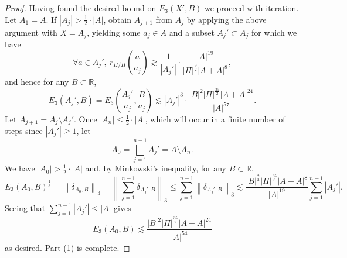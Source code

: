\documentclass[reqno]{amsart}
\numberwithin{equation}{section}
\begin{document}
\begin{proof}
Having found the desired bound on \(E_3(X',B)\) we proceed with iteration.
Let \(A_1 = A\). 
If \(\left\lvert A_{j} \right\rvert  > \frac{1}{2} \cdot \left\lvert A \right\rvert  \), obtain \(A_{j+1} \) from \(A_{j} \) by applying the above argument
with \(X = A_{j} \), yielding some \(a_{j}  \in A\) and a subset \(A_{j} ' \subset A_{j} \) for which we have
\[
    \forall a \in A_{j} ' ,~ r_{ \Pi / \Pi } \left( \frac{a}{a_{j} }   \right)  \gtrsim \frac{1}{\left\lvert A_{j} ' \right\rvert } \cdot \frac{\left\lvert A \right\rvert ^{19}}{\left\lvert \Pi \right\rvert ^{\frac{9}{2} } \left\lvert A + A \right\rvert ^{8}} 
,\]
and hence for any \(B \subset \mathbb{R} \),
\[
    E_3(A_{j} ',B) = E_3 \left( \frac{A_{j} '}{a_{j} } , \frac{B}{a_{j} }    \right) \lesssim \left\lvert A_{j} ' \right\rvert ^{3} \cdot \frac{\left\lvert B \right\rvert ^{2} \left\lvert \Pi \right\rvert ^{\frac{35}{2} }\left\lvert A+A \right\rvert ^{24}}{\left\lvert A \right\rvert ^{57}} 
.\]
Let \(A_{j+1} = A_{j} \setminus A_{j} ' \). Once \(\left\lvert A_{n}  \right\rvert \leq \frac{1}{2} \cdot \left\lvert A \right\rvert     \), which will occur in a finite number of steps since \(\left\lvert A_{j} '  \right\rvert \geq 1\),
let
\[
    A_0 = \bigsqcup  _{j=1} ^{n-1}A_{j} ' = A \setminus A_{n} 
.\]
We have \(\left\lvert A_0 \right\rvert > \frac{1}{2} \cdot \left\lvert A \right\rvert \) and, by Minkowski's inequality, for any \(B \subset \mathbb{R} \),
\[
    E_3(A_0,B)^{\frac{1}{3} } = \left\lVert \delta_{A_0,B}  \right\rVert _{3} = \left\lVert \sum _{j =1} ^{n-1} \delta_{A_{j}' ,B}  \right\rVert _{3} \leq \sum _{j=1} ^{n-1} \left\lVert \delta_{A_{j}' ,B}  \right\rVert _{3} \lesssim \frac{\left\lvert B \right\rvert ^{\frac{2}{3} } \left\lvert \Pi \right\rvert ^{\frac{35}{6}  } \left\lvert A+ A \right\rvert ^{8}}{\left\lvert A \right\rvert ^{19}} \sum _{j=1} ^{n-1} \left\lvert A_{j} ' \right\rvert 
.\]
Seeing that \( \sum _{j=1} ^{n-1}\left\lvert A_{j} ' \right\rvert \leq \left\lvert A \right\rvert   \) gives
\[
    E_3(A_0,B)\lesssim \frac{\left\lvert B \right\rvert^{2}  \left\lvert \Pi \right\rvert ^{\frac{35}{2} } \left\lvert A+A \right\rvert ^{24}}{\left\lvert A \right\rvert ^{54}} 
\]
as desired. Part (1) is complete.


\end{proof}
\end{document}
